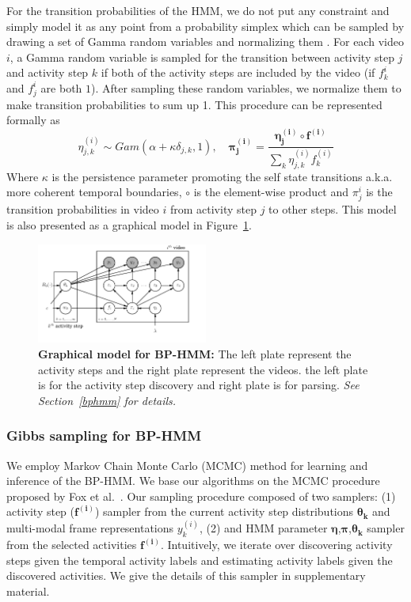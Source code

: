 For the transition probabilities of the HMM, we do not put any constraint and simply model it as any point from a probability simplex which can be sampled by drawing a set of Gamma random variables and normalizing them \cite{foxBPHMM}. For each video $i$, a Gamma random variable is sampled for the transition between activity step $j$ and activity step $k$ if both of the activity steps are included by the video (\ie if $f^i_k$ and $f^i_j$ are both $1$). After sampling these random variables, we normalize them to make transition probabilities to sum up 1. This procedure can be represented formally as
\begin{equation}
  \eta_{j,k}^{(i)} \sim Gam(\alpha+\kappa \delta_{j,k},1), \quad \mathbf{\pi_j^{(i)}} = \frac{\mathbf{\eta^{(i)}_j} \circ \mathbf{f^{(i)}}}{\sum_k \eta^{(i)}_{j,k} f^{(i)}_k}
\end{equation}
Where $\kappa$ is the persistence parameter promoting the self state transitions a.k.a. more coherent temporal boundaries, $\circ$ is the element-wise product and $\pi^i_j$ is the transition probabilities in video $i$ from activity step $j$ to other steps. This model is also presented as a graphical model in Figure~\ref{bphmmo}.
\begin{figure}[h!]
  \includegraphics[width=0.5\textwidth]{plate}
  \vspace{-9mm}
  \caption{\textbf{Graphical model for BP-HMM:} The left plate represent the activity steps and the right plate represent the videos. \ie the left plate is for the activity step discovery and right plate is for parsing. \emph{See Section~\ref{bphmm} for details.}}
  \vspace{-5mm}
  \label{bphmmo}
\end{figure}


\subsubsection{Gibbs sampling for BP-HMM}
We employ Markov Chain Monte Carlo (MCMC) method for learning and inference of the BP-HMM. We base our algorithms on the MCMC procedure proposed by Fox et al.~\cite{foxBPHMM}. Our sampling procedure composed of two samplers: (1) activity step ($\mathbf{f^{(i)}}$) sampler from the current activity step distributions $\mathbf{\theta_k}$ and multi-modal frame representations $y^{(i)}_k$, (2) and HMM parameter $\mathbf{\eta}$,$\mathbf{\pi}$,$\mathbf{\theta_k}$ sampler from the selected activities $\mathbf{f^{(i)}}$. Intuitively, we iterate over discovering activity steps given the temporal activity labels and estimating activity labels given the discovered activities. We give the details of this sampler in supplementary material.
